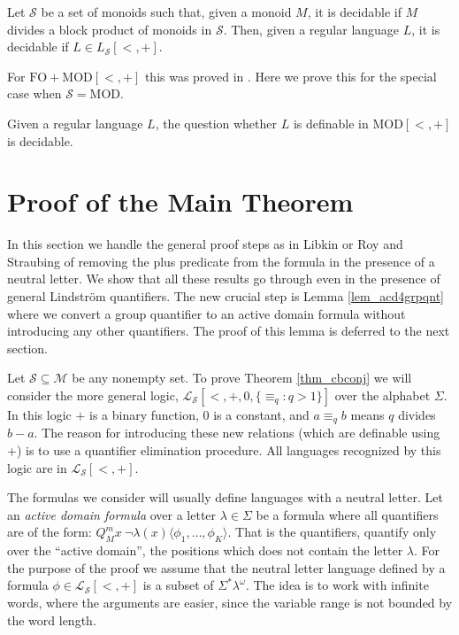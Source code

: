 \documentclass[envcountsame]{llncs}
\newcommand{\mon}[2]{Q_{#1}^{#2}}
\newcommand{\FO}{\mathrm{FO}}
\newcommand{\MOD}{\mathrm{MOD}}
\begin{document}
\begin{corollary}
Let $\mathcal{S}$ be a set of monoids such that, given a monoid $M$, it is decidable if $M$ divides a block product of monoids in
$\mathcal{S}$. Then, given a regular language $L$, it is decidable if $L \in L_{\mathcal{S}}[<,+]$.
\end{corollary}

For $\FO+\MOD[<,+]$ this was proved in \cite{roy_defGenFO}. Here we prove this for the special case when $\mathcal{S}=\MOD$.
\begin{corollary}
Given a regular language $L$, the question whether $L$ is definable in $\MOD[<,+]$ is decidable.
\end{corollary}

\bigskip
\section{Proof of the Main Theorem}\label{sec_cranebeach}
In this section we handle the general proof steps as in Libkin or Roy and Straubing of removing the plus predicate from the formula in the presence of a neutral letter. We show that all these results go through even in the presence of general Lindstr\"om quantifiers. The new crucial step is Lemma \ref{lem_acd4grpqnt} where we convert a group quantifier to an active domain formula without introducing any other quantifiers. The proof of this lemma is deferred to the next section.


Let $\mathcal{S \subseteq M}$ be any nonempty set. To prove Theorem \ref{thm_cbconj} we will consider the more general logic, $\mathcal{L_S}[<,+,0,\{\equiv_q:q>1\}]$ over 
the alphabet $\Sigma$. In this logic $+$ is a binary function, $0$ is a constant, and $a \equiv_q b$ means $q$ divides $b-a$. 
The reason for introducing these new relations (which are definable using $+$) is to use a quantifier elimination procedure.
All languages recognized by this logic are in $\mathcal{L_S}[<,+]$. 

The formulas we consider will usually define languages with a neutral letter. 
Let an \emph{active domain formula} over a letter $\lambda \in \Sigma$ be a formula where all quantifiers are of the form:
$\mon{M}{m} x ~\neg \lambda(x) \langle \phi_1,\dots,\phi_K \rangle$.
That is the quantifiers, quantify only over the ``active domain'', the positions which does not contain the letter $\lambda$.
For the purpose of the proof we assume that the neutral letter language defined by a formula $\phi \in \mathcal{L_S}[<,+]$ is a subset of $\Sigma^*\lambda^{\omega}$. 
The idea is to work with infinite words, where the arguments are easier, since the variable range is not bounded by the word length.
\end{document}
